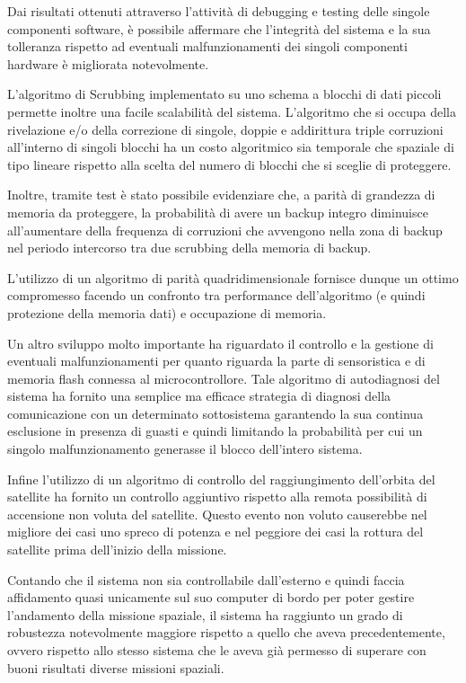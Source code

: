 \documentclass[LaM,binding=0.6cm,oneside]{../sapthesis}
\begin{document}
Dai risultati ottenuti attraverso l'attività di debugging e testing delle singole componenti software, è possibile affermare che l'integrità 
del sistema e la sua tolleranza rispetto ad eventuali malfunzionamenti dei singoli componenti hardware è migliorata notevolmente.

L'algoritmo di Scrubbing implementato su uno schema a blocchi di dati piccoli permette inoltre una facile scalabilità del sistema. L'algoritmo che
si occupa della rivelazione e/o della correzione di singole, doppie e addirittura triple corruzioni all'interno di
singoli blocchi ha un costo algoritmico sia temporale che spaziale di tipo lineare rispetto alla scelta del numero di blocchi che si sceglie di 
proteggere. 

Inoltre, tramite test è stato possibile evidenziare che, a parità di grandezza di memoria da proteggere, la probabilità di avere un backup integro diminuisce all'aumentare della frequenza di corruzioni che avvengono nella zona di backup nel periodo intercorso tra due scrubbing della memoria di backup.

L'utilizzo di un algoritmo di parità quadridimensionale fornisce dunque un ottimo compromesso facendo un confronto tra performance dell'algoritmo (e
quindi protezione della memoria dati) e occupazione di memoria.

Un altro sviluppo molto importante ha riguardato il controllo e la gestione di eventuali malfunzionamenti per quanto riguarda la parte di sensoristica 
e di memoria flash connessa al microcontrollore. Tale algoritmo di autodiagnosi del sistema ha fornito una semplice ma efficace strategia di diagnosi della comunicazione con un determinato sottosistema garantendo la sua continua esclusione in presenza di guasti e quindi limitando la probabilità per cui un singolo malfunzionamento generasse il blocco dell'intero sistema.

Infine l'utilizzo di un algoritmo di controllo del raggiungimento dell'orbita del satellite ha fornito un controllo aggiuntivo rispetto alla remota possibilità
di accensione non voluta del satellite. Questo evento non voluto causerebbe nel migliore dei casi uno spreco di potenza e nel peggiore dei casi la rottura del satellite
prima dell'inizio della missione.

Contando che il sistema non sia controllabile dall'esterno e quindi faccia affidamento quasi unicamente sul suo computer di bordo per poter gestire 
l'andamento della missione spaziale, il sistema ha raggiunto un grado di robustezza notevolmente maggiore rispetto a quello che aveva precedentemente, ovvero rispetto allo stesso sistema che le aveva già permesso di superare con buoni risultati diverse missioni spaziali.
\end{document}
